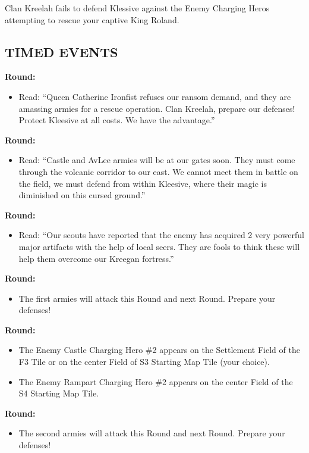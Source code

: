 \begin{multicols*}{2}
Clan Kreelah fails to defend Klessive against the Enemy Charging Heros attempting to rescue your captive King Roland.

\subsection*{\MakeUppercase{Timed Events}}

\textbf{ Round:}
\begin{itemize}
  \item Read: ``Queen Catherine Ironfist refuses our ransom demand, and they are amassing armies for a rescue
    operation. Clan Kreelah, prepare our defenses! Protect Kleesive at all costs. We have the advantage.''
\end{itemize}

\textbf{ Round:}
\begin{itemize}
  \item Read: ``Castle and AvLee armies will be at our gates soon. They must come through the volcanic corridor
    to our east. We cannot meet them in battle on the field, we must defend from within Kleesive, where  %
    their magic is diminished on this cursed ground.''
\end{itemize}

\textbf{ Round:}
\begin{itemize}
  \item Read: ``Our scouts have reported that the enemy has acquired 2 very powerful major artifacts with the
    help of local seers. They are fools to think these will help them overcome our Kreegan fortress.”
\end{itemize}

\textbf{ Round:}
\begin{itemize}
  \item The first armies will attack this Round and next Round. Prepare your defenses!
\end{itemize}

\textbf{ Round:}
\begin{itemize}
  \item The Enemy Castle Charging Hero \#2 appears on the Settlement Field of the F3 Tile or on the center Field of S3 Starting Map Tile (your choice).
  \item The Enemy Rampart Charging Hero \#2 appears on the center Field of the S4 Starting Map Tile.
\end{itemize}

\textbf{ Round:}
\begin{itemize}
  \item The second armies will attack this Round and next Round. Prepare your defenses!
\end{itemize}



\end{multicols*}
